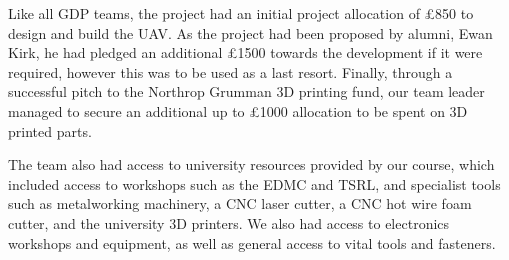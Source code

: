 \documentclass[../../main.tex]{subfiles}
\begin{document}
Like all GDP teams, the project had an initial project allocation of £850 to design and build the UAV.
As the project had been proposed by alumni, Ewan Kirk, he had pledged an additional £1500 towards the development if it were required, however this was to be used as a last resort.
Finally, through a successful pitch to the Northrop Grumman 3D printing fund, our team leader managed to secure an additional up to £1000 allocation to be spent on 3D printed parts. 

The team also had access to university resources provided by our course, which included access to workshops such as the EDMC and TSRL, and specialist tools such as metalworking machinery, a CNC laser cutter, a CNC hot wire foam cutter, and the university 3D printers.
We also had access to electronics workshops and equipment, as well as general access to vital tools and fasteners.
\end{document}
